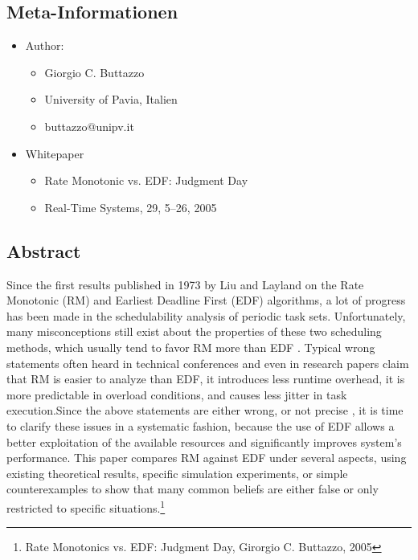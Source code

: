 \subsection{Meta-Informationen}
\begin{frame}{\subsecname}
	\begin{itemize}
		\item Author:
		\begin{itemize}
			\item Giorgio C. Buttazzo
			\item University of Pavia, Italien
			\item buttazzo@unipv.it
		\end{itemize}\pause
		\item Whitepaper
		\begin{itemize}
			\item Rate Monotonic vs. EDF: Judgment Day
			\item Real-Time Systems, 29, 5–26, 2005
		\end{itemize}						
		
	\end{itemize}
\end{frame} 

\subsection{Abstract}
\begin{frame}{\subsecname}
\tiny Since the first results published in 1973 by Liu and Layland on the Rate Monotonic (RM) and Earliest Deadline First (EDF) algorithms, a lot of progress has been made in the schedulability analysis of periodic task sets. Unfortunately, many \Large misconceptions \tiny still exist about the properties of these two scheduling methods, which usually tend to \Large favor RM more than EDF \tiny. Typical wrong statements often heard in technical conferences and even in research papers claim that RM is easier to analyze than EDF, it introduces less runtime overhead, it is more predictable in overload conditions, and causes less jitter in task execution.Since the above statements are \Large  either wrong, or not precise \tiny, it is time to clarify these issues in a systematic fashion, because the use of EDF allows a better exploitation of the available resources and significantly improves system’s performance. \Large This paper compares RM against EDF \tiny under several aspects, using existing theoretical results, specific simulation experiments, or simple counterexamples to show that many common beliefs are either false or only restricted to specific situations.\footnote{Rate Monotonics vs. EDF: Judgment Day, Girorgio C. Buttazzo, 2005}
\end{frame}

